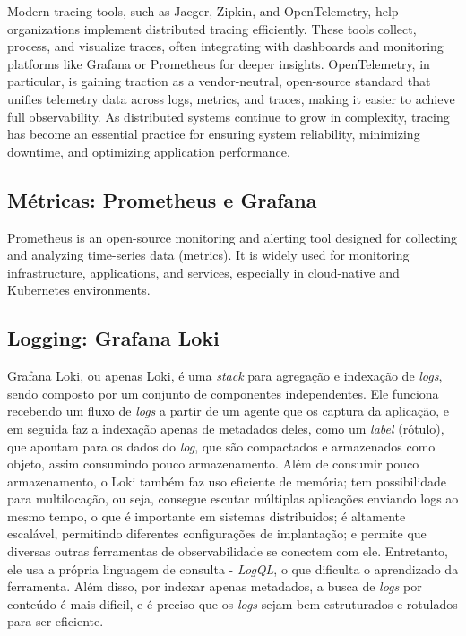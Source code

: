 Modern tracing tools, such as Jaeger, Zipkin, and OpenTelemetry, help organizations implement distributed tracing efficiently. These tools collect, process, and visualize traces, often integrating with dashboards and monitoring platforms like Grafana or Prometheus for deeper insights. OpenTelemetry, in particular, is gaining traction as a vendor-neutral, open-source standard that unifies telemetry data across logs, metrics, and traces, making it easier to achieve full observability. As distributed systems continue to grow in complexity, tracing has become an essential practice for ensuring system reliability, minimizing downtime, and optimizing application performance.

\subsection{Métricas: Prometheus e Grafana}
Prometheus is an open-source monitoring and alerting tool designed for collecting and analyzing time-series data (metrics). It is widely used for monitoring infrastructure, applications, and services, especially in cloud-native and Kubernetes environments. \cite{prometheus-docs}

\subsection{Logging: Grafana Loki}
Grafana Loki, ou apenas Loki, é uma \emph{stack} para agregação e indexação de \emph{logs}, sendo composto por um conjunto de componentes independentes. Ele funciona recebendo um fluxo de \emph{logs} a partir de um agente que os captura da aplicação, e em seguida faz a indexação apenas de metadados deles, como um \emph{label} (rótulo), que apontam para os dados do \emph{log}, que são compactados e armazenados como objeto, assim consumindo pouco armazenamento. Além de consumir pouco armazenamento, o Loki também faz uso eficiente de memória; tem possibilidade para multilocação, ou seja, consegue escutar múltiplas aplicações enviando logs ao mesmo tempo, o que é importante em sistemas distribuidos; é altamente escalável, permitindo diferentes configurações de implantação; e permite que diversas outras ferramentas de observabilidade se conectem com ele. Entretanto, ele usa a própria linguagem de consulta - \emph{LogQL}, o que dificulta o aprendizado da ferramenta. Além disso, por indexar apenas metadados, a busca de \emph{logs} por conteúdo é mais dificil, e é preciso que os \emph{logs} sejam bem estruturados e rotulados para ser eficiente. \cite{grafana-loki}

